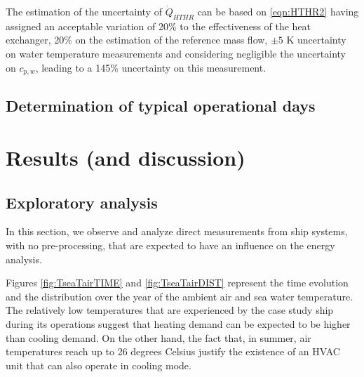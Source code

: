 \documentclass[preprint,12pt]{elsarticle}
\begin{document}
The estimation of the uncertainty of $\dot{Q}_{HTHR}$ can be based on \ref{eqn:HTHR2} having assigned an acceptable variation of 20\% to the effectiveness of the heat exchanger, 20\% on the estimation of the reference mass flow, $\pm 5$ K uncertainty on water temperature measurements and considering negligible the uncertainty on $c_{p,w}$, leading to a 145\% uncertainty on this measurement. 



\subsection{Determination of typical operational days}












\section{Results (and discussion)}

\subsection{Exploratory analysis} \label{sec:res:exploratory}

In this section, we observe and analyze direct measurements from ship systems, with no pre-processing, that are expected to have an influence on the energy analysis.

Figures \ref{fig:TseaTairTIME} and \ref{fig:TseaTairDIST} represent the time evolution and the distribution over the year of the ambient air and sea water temperature. The relatively low temperatures that are experienced by the case study ship during its operations suggest that heating demand can be expected to be higher than cooling demand. On the other hand, the fact that, in summer, air temperatures reach up to 26 degrees Celsius justify the existence of an HVAC unit that can also operate in cooling mode. 
\end{document}
